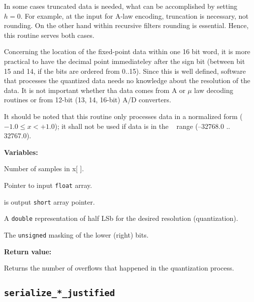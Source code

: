 In some cases truncated data is needed, what can be accomplished by
setting $h=0$. For example, at the input for A-law encoding, truncation
is necessary, not rounding. On the other hand within recursive filters
rounding is essential. Hence, this routine serves both cases.

Concerning the location of the fixed-point data within one 16 bit word,
it is more practical to have the decimal point immediateley after the
sign bit (between bit 15 and 14, if the bits are ordered from 0..15).
Since this is well defined, software that processes the quantized
data needs no knowledge about the resolution of the data. It is not
important whether tha data comes from A or $\mu$ law decoding
routines or from 12-bit (13, 14, 16-bit) A/D converters.

It should be noted that this routine only processes data in a
normalized form ($-1.0 \leq x < +1.0$); it shall not be used if data
is in the \short~ range (--32768.0 .. 32767.0).

{\bf Variables: }
\begin{Descr}{\DescrLen}
 \item[\pbox{20mm}{\em n}] %
                     Number of samples in x[ ].

 \item[\pbox{20mm}{\em x}] %
                     Pointer to input {\tt float} array.

 \item[\pbox{20mm}{\em iy}] %
                     is output {\tt short} array pointer.

 \item[\pbox{20mm}{\em half\_lsb}] %
                     A {\tt double} representation of half LSb for the
                     desired resolution (quantization).

 \item[\pbox{20mm}{\em mask}] %
                     The {\tt unsigned} masking of the lower (right) bits.
\end{Descr}

{\bf Return value: }

Returns the number of overflows that happened in the quantization process.


\subsection{{\tt serialize\_*\_justified}}

